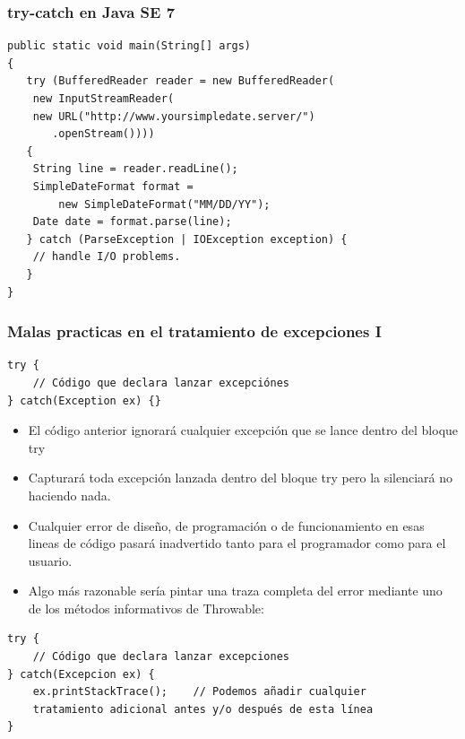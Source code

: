 \documentclass{beamer}
\begin{document}
\begin{frame}[fragile]
\frametitle{try-catch en Java SE 7}
\begin{verbatim}
public static void main(String[] args)
{
   try (BufferedReader reader = new BufferedReader(
   	new InputStreamReader(
   	new URL("http://www.yoursimpledate.server/")
   	   .openStream())))
   {
   	String line = reader.readLine();
   	SimpleDateFormat format = 
   	    new SimpleDateFormat("MM/DD/YY");
   	Date date = format.parse(line);
   } catch (ParseException | IOException exception) {
   	// handle I/O problems.
   }
}
\end{verbatim}
\end{frame}


\begin{frame}[fragile]
\frametitle{Malas practicas en el tratamiento de excepciones I}
\begin{scriptsize}
\begin{verbatim}
try { 
    // Código que declara lanzar excepciónes 
} catch(Exception ex) {}
\end{verbatim}
\end{scriptsize}
\pause
\begin{itemize}[<+->]
\item El código anterior ignorará cualquier excepción que se lance dentro del bloque try
\item Capturará toda excepción lanzada dentro del bloque try pero la silenciará no haciendo nada.
\item Cualquier error de diseño, de programación o de funcionamiento en esas lineas de código pasará inadvertido tanto para el programador como para el usuario. 
\item  Algo más razonable sería pintar una traza completa del error mediante uno de los métodos informativos de Throwable: 
\end{itemize}
\pause
\begin{scriptsize}
\begin{verbatim}
try { 
    // Código que declara lanzar excepciones 
} catch(Excepcion ex) { 
    ex.printStackTrace();    // Podemos añadir cualquier 
    tratamiento adicional antes y/o después de esta línea 
}
\end{verbatim}
\end{scriptsize}
\end{frame}
\end{document}
